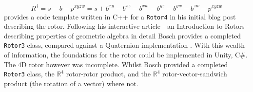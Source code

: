 \documentclass{l4proj}
\begin{document}
%
\begin{equation}
  \label{eq:rotor_rev}
  R^{\dagger} = s - b - p^{xyzw} = 
  s + b^{xy} - b^{xz} - b^{xw} - b^{yz} - b^{yw} - b^{zw} - p^{xyzw}
\end{equation}
%
\citet{bosch_4d_2011} provides a code template written in C++ for a \texttt{Rotor4} in his initial blog post describing the rotor. Following his interactive article - an Introduction to Rotors - describing properties of geometric algebra in detail \citep{bosch_lets_nodate} Bosch provides a completed \texttt{Rotor3} class, compared against a Quaternion implementation \citep{bosch_code_nodate}. With this wealth of information, the foundations for the rotor could be implemented in Unity, C\#. The 4D rotor however was incomplete. 
Whilst Bosch provided a completed \texttt{Rotor3} class, the $\mathbb{R}^4$ rotor-rotor product, and the $\mathbb{R}^4$ rotor-vector-sandwich product (the rotation of a vector) where not. 
\end{document}
